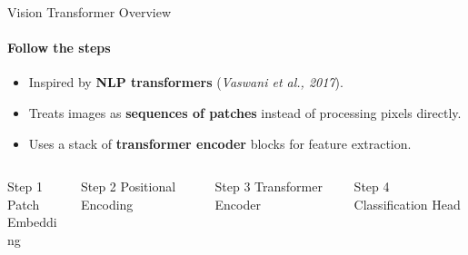 \begin{frame}{Vision Transformer Overview}
  \framesubtitle{Follow the steps}
  \begin{itemize}
    \item Inspired by \textbf{NLP transformers} (\textit{Vaswani et al., 2017}).
    \item Treats images as \textbf{sequences of patches} instead of processing pixels directly.
    \item Uses a stack of \textbf{transformer encoder} blocks for feature extraction.
  \end{itemize}
  \begin{columns}
    \begin{column}{0.2\textwidth}
      \begin{block}{Step 1}
        Patch \\ Embedding
      \end{block}
    \end{column}
    \begin{column}{0.2\textwidth}
      \begin{block}{Step 2}
        Positional Encoding
      \end{block}
    \end{column}
    \begin{column}{0.2\textwidth}
      \begin{block}{Step 3}
        Transformer Encoder
      \end{block}
    \end{column}
    \begin{column}{0.2\textwidth}
      \begin{block}{Step 4}
        Classification Head
      \end{block}
    \end{column}
  \end{columns}
\end{frame}